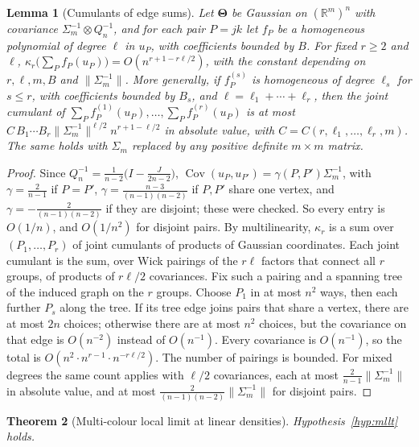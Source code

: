 \documentclass[11pt]{article}
\newtheorem{theorem}{Theorem}
\newtheorem{lemma}[theorem]{Lemma}
\begin{document}
\begin{lemma}[Cumulants of edge sums]
\label{lem:edge-cumulants}
Let \(\boldsymbol\Theta\) be Gaussian on \((\mathbb R^m)^n\) with covariance
\(\Sigma_m^{-1}\otimes Q_n^{-1}\), and for each pair \(P=jk\) let \(f_P\) be a
homogeneous polynomial of degree \(\ell\) in \(u_P\), with coefficients bounded
by \(B\). For fixed \(r\ge2\) and \(\ell\),
\(\kappa_r\bigl(\sum_Pf_P(u_P)\bigr)=O(n^{r+1-r\ell/2})\), with the constant depending
on \(r,\ell,m,B\) and \(\|\Sigma_m^{-1}\|\).
More generally, if \(f^{(s)}_P\) is homogeneous of degree \(\ell_s\) for
\(s\le r\), with coefficients bounded by \(B_s\), and \(\ell=\ell_1+\cdots+\ell_r\), then
the joint cumulant of \(\sum_Pf^{(1)}_P(u_P),\ldots,\sum_Pf^{(r)}_P(u_P)\) is at most
\(C\,B_1\cdots B_r\|\Sigma_m^{-1}\|^{\ell/2}n^{r+1-\ell/2}\) in absolute value, with
\(C=C(r,\ell_1,\ldots,\ell_r,m)\). The same holds with \(\Sigma_m\) replaced by
any positive definite \(m\times m\) matrix.
\end{lemma}

\begin{proof}
Since \(Q_n^{-1}=\frac1{n-2}\bigl(I-\frac{J}{2n-2}\bigr)\),
\(\operatorname{Cov}(u_P,u_{P'})=\gamma(P,P')\Sigma_m^{-1}\), with
\(\gamma=\frac2{n-1}\) if \(P=P'\), \(\gamma=\frac{n-3}{(n-1)(n-2)}\) if \(P,P'\)
share one vertex, and \(\gamma=-\frac2{(n-1)(n-2)}\) if they are disjoint; these
were checked. So every entry is \(O(1/n)\), and \(O(1/n^2)\) for disjoint pairs.
By multilinearity, \(\kappa_r\) is a sum over \((P_1,\ldots,P_r)\) of joint cumulants
of products of Gaussian coordinates. Each joint cumulant is the sum, over
Wick pairings of the \(r\ell\) factors that connect all \(r\) groups, of
products of \(r\ell/2\) covariances.
Fix such a pairing and a spanning tree of the induced graph on the \(r\)
groups. Choose \(P_1\) in at most \(n^2\) ways, then each further \(P_s\)
along the tree. If its tree edge joins pairs that share a vertex, there are
at most \(2n\) choices; otherwise there are at most \(n^2\) choices, but the
covariance on that edge is \(O(n^{-2})\) instead of \(O(n^{-1})\).
Every covariance is \(O(n^{-1})\), so the total is
\(O(n^2\cdot n^{r-1}\cdot n^{-r\ell/2})\).
The number of pairings is bounded.
For mixed degrees the same count applies with \(\ell/2\) covariances, each
at most \(\frac2{n-1}\|\Sigma_m^{-1}\|\) in absolute value, and at most
\(\frac2{(n-1)(n-2)}\|\Sigma_m^{-1}\|\) for disjoint pairs.
\end{proof}

\begin{theorem}[Multi-colour local limit at linear densities]
\label{thm:mllt}
Hypothesis~\ref{hyp:mllt} holds.
\end{theorem}
\end{document}

